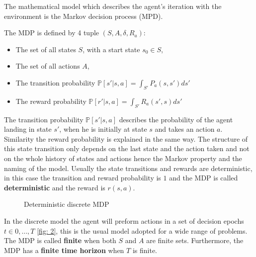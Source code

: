 The mathematical model which describes the agent's iteration with the
environment is the Markov decision process (MPD).
\begin{definition}
    The MDP is defined by 4 tuple $(S, A, \delta, R_a)$:
    \begin{itemize}
        \item The set of all states $S$, with a start state $s_0 \in S$,
        \item The set of all actions $A$,
        \item The transition probability $\mathbb{P}[s'|s, a] = \int_{S'}
            P_a(s, s') ds'$
        \item The reward probability $\mathbb{P}[r'|s, a] =
            \int_{S'}R_a\left(s', s  \right)ds' $
    \end{itemize}
\end{definition}
The transition probability $\mathbb{P}[s'|s, a]$ describes the probability of
the agent landing in state $s'$, when he is initially at state $s$ and takes
an action $a$. Similarity the reward probability is explained in the same way. The
structure of this state transition only depends on the last state and the
action taken and not on the whole history of states and actions hence the
Markov property and the naming of the model. Usually the state transitions and
rewards are deterministic, in this case the transition and reward probability
is $1$ and the MDP is called \textbf{deterministic} and the reward is $r(s, a)$.
\begin{figure}[h!]
    \centering
    \caption{Deterministic discrete MDP \label{fig: 2} \cite{ml_foundations}}
    \label{}
\end{figure}
In the discrete model the agent will preform actions in a set of decision
epochs $t \in {0,\ldots,T}$ \ref{fig: 2}, this is the usual model adopted for a wide range
of problems. The MDP is called \textbf{finite} when both $S$ and $A$ are
finite sets. Furthermore, the MDP has a \textbf{finite time horizon} when $T$
is finite.
\newline

